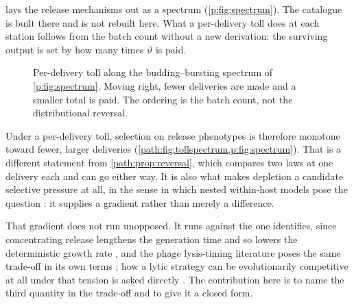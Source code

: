  lays the release mechanisms out as a spectrum
(\cref{p:fig:spectrum}). The catalogue is built there and is not rebuilt
here. What a per-delivery toll does at each station follows from the batch
count without a new derivation: the surviving output is set by how many
times $\vartheta$ is paid.

\begin{figure}[!h]
\centering
{}
\caption{Per-delivery toll along the budding--bursting spectrum of
\cref{p:fig:spectrum}. Moving right, fewer deliveries are made and a
smaller total is paid. The ordering is the batch count, not the
distributional reversal.}
\label{path:fig:tollspectrum}
\end{figure}

Under a per-delivery toll, selection on release phenotypes is therefore
monotone toward fewer, larger deliveries
(\cref{path:fig:tollspectrum,p:fig:spectrum}). That is a different
statement from \cref{path:prop:reversal}, which compares two laws at one
delivery each and can go either way. It is also what makes depletion a
candidate selective pressure at all, in the sense in which nested
within-host models pose the question \cite{gilchrist2006evolution}: it
supplies a gradient rather than merely a difference.

That gradient does not run unopposed. It runs against the one \ChPop{}
identifies, since concentrating release lengthens the generation time and so
lowers the deterministic growth rate \cite{wallinga2007generation}, and the
phage lysis-timing literature poses the same trade-off in its own terms
\cite{wang2006lysis}; how a lytic strategy can be evolutionarily competitive
at all under that tension is asked directly \cite{komarova2007viral}. The
contribution here is to name the third quantity in the trade-off and to give
it a closed form.

